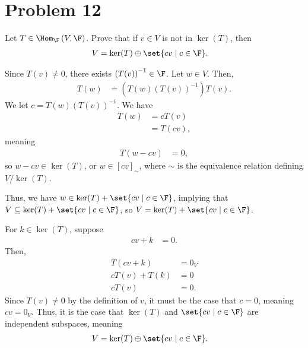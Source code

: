 \documentclass[10pt]{mypackage}
\begin{document}
\section{Problem 12}%
\begin{problem}
  Let $T\in \Hom_{\F}\left(V,\F\right)$. Prove that if $v\in V$ is not in $\ker(T)$, then
  \begin{align*}
    V &= \ker(T) \oplus \set{cv\mid c\in\F}.
  \end{align*}
\end{problem}
\begin{solution}
  Since $T(v)\neq 0$, there exists $\left(T(v)\right)^{-1}\in \F$. Let $w\in V$. Then,
  \begin{align*}
    T(w) &= \left(T(w)\left(T(v)\right)^{-1}\right)T(v).
  \end{align*}
  We let $c = T(w)\left(T(v)\right)^{-1}$. We have
  \begin{align*}
    T(w) &= cT(v)\\
         &= T(cv),
  \end{align*}
  meaning
  \begin{align*}
    T\left(w - cv\right) &= 0,
  \end{align*}
  so $w-cv\in \ker(T)$, or $w\in \left[cv\right]_{\sim}$, where $\sim$ is the equivalence relation defining $V/\ker(T)$.\newline

  Thus, we have $w \in \ker(T) + \set{cv\mid c\in \F}$, implying that $V \subseteq \ker(T) + \set{cv\mid c\in \F}$, so $V = \ker(T) + \set{cv\mid c\in\F}$.\newline

  For $k\in\ker(T)$, suppose
  \begin{align*}
    cv + k &= 0.
  \end{align*}
  Then,
  \begin{align*}
    T\left(cv + k\right) &= 0_V\\
    cT\left(v\right) + T(k) &= 0\\
    cT\left(v\right) &= 0.
  \end{align*}
  Since $T(v)\neq 0$ by the definition of $v$, it must be the case that $c=0$, meaning $cv = 0_V$. Thus, it is the case that $\ker(T)$ and $\set{cv\mid c\in\F}$ are independent subspaces, meaning
  \begin{align*}
    V &= \ker(T)\oplus \set{cv\mid c\in\F}.
  \end{align*}
\end{solution}
\end{document}
